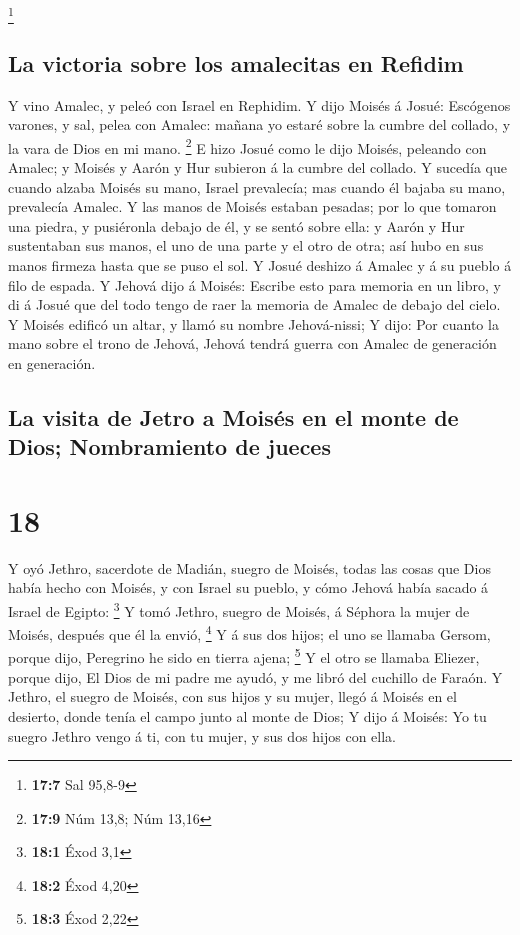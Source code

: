\footnote{\textbf{17:7} Sal 95,8-9}

\hypertarget{la-victoria-sobre-los-amalecitas-en-refidim}{%
\subsection{La victoria sobre los amalecitas en
Refidim}\label{la-victoria-sobre-los-amalecitas-en-refidim}}

 Y vino Amalec, y peleó con Israel en Rephidim. 
Y dijo Moisés á Josué: Escógenos varones, y sal, pelea con Amalec:
mañana yo estaré sobre la cumbre del collado, y la vara de Dios en mi
mano. \footnote{\textbf{17:9} Núm 13,8; Núm 13,16}  E hizo
Josué como le dijo Moisés, peleando con Amalec; y Moisés y Aarón y Hur
subieron á la cumbre del collado.  Y sucedía que cuando
alzaba Moisés su mano, Israel prevalecía; mas cuando él bajaba su mano,
prevalecía Amalec.  Y las manos de Moisés estaban pesadas;
por lo que tomaron una piedra, y pusiéronla debajo de él, y se sentó
sobre ella: y Aarón y Hur sustentaban sus manos, el uno de una parte y
el otro de otra; así hubo en sus manos firmeza hasta que se puso el sol.
 Y Josué deshizo á Amalec y á su pueblo á filo de espada.
 Y Jehová dijo á Moisés: Escribe esto para memoria en un
libro, y di á Josué que del todo tengo de raer la memoria de Amalec de
debajo del cielo.  Y Moisés edificó un altar, y llamó su
nombre Jehová-nissi;  Y dijo: Por cuanto la mano sobre el
trono de Jehová, Jehová tendrá guerra con Amalec de generación en
generación.

\hypertarget{la-visita-de-jetro-a-moisuxe9s-en-el-monte-de-dios-nombramiento-de-jueces}{%
\subsection{La visita de Jetro a Moisés en el monte de Dios;
Nombramiento de
jueces}\label{la-visita-de-jetro-a-moisuxe9s-en-el-monte-de-dios-nombramiento-de-jueces}}

\hypertarget{section-17}{%
\section{18}\label{section-17}}

 Y oyó Jethro, sacerdote de Madián, suegro de Moisés, todas
las cosas que Dios había hecho con Moisés, y con Israel su pueblo, y
cómo Jehová había sacado á Israel de Egipto: \footnote{\textbf{18:1}
  Éxod 3,1}  Y tomó Jethro, suegro de Moisés, á Séphora la
mujer de Moisés, después que él la envió, \footnote{\textbf{18:2} Éxod
  4,20}  Y á sus dos hijos; el uno se llamaba Gersom, porque
dijo, Peregrino he sido en tierra ajena; \footnote{\textbf{18:3} Éxod
  2,22}  Y el otro se llamaba Eliezer, porque dijo, El Dios
de mi padre me ayudó, y me libró del cuchillo de Faraón.  Y
Jethro, el suegro de Moisés, con sus hijos y su mujer, llegó á Moisés en
el desierto, donde tenía el campo junto al monte de Dios;  Y
dijo á Moisés: Yo tu suegro Jethro vengo á ti, con tu mujer, y sus dos
hijos con ella.

